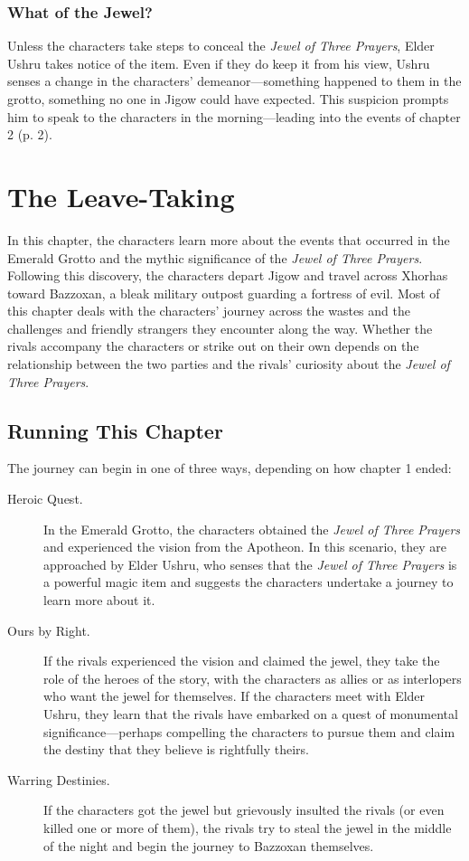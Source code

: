 \documentclass[a4paper, 11pt, bg=full, twocolumn, nooutline]{dndbook}
\begin{document}
\subsection{What of the Jewel?}

Unless the characters take steps to conceal the \textit{Jewel of Three Prayers}, Elder Ushru takes notice of the item. Even if they do keep it from his view, Ushru senses a change in the characters' demeanor---something happened to them in the grotto, something no one in Jigow could have expected. This suspicion prompts him to speak to the characters in the morning---leading into the events of chapter 2 (p. 2).

\chapter{The Leave-Taking}\label{ch:the-leave-taking-3-3}

In this chapter, the characters learn more about the events that occurred in the Emerald Grotto and the mythic significance of the \textit{Jewel of Three Prayers}. Following this discovery, the characters depart Jigow and travel across Xhorhas toward Bazzoxan, a bleak military outpost guarding a fortress of evil.
Most of this chapter deals with the characters' journey across the wastes and the challenges and friendly strangers they encounter along the way. Whether the rivals accompany the characters or strike out on their own depends on the relationship between the two parties and the rivals' curiosity about the \textit{Jewel of Three Prayers}.
\section{Running This Chapter}

The journey can begin in one of three ways, depending on how chapter 1 ended:

\begin{description}
\item[Heroic Quest.] In the Emerald Grotto, the characters obtained the \textit{Jewel of Three Prayers} and experienced the vision from the Apotheon. In this scenario, they are approached by Elder Ushru, who senses that the \textit{Jewel of Three Prayers} is a powerful magic item and suggests the characters undertake a journey to learn more about it.
\item[Ours by Right.] If the rivals experienced the vision and claimed the jewel, they take the role of the heroes of the story, with the characters as allies or as interlopers who want the jewel for themselves. If the characters meet with Elder Ushru, they learn that the rivals have embarked on a quest of monumental significance---perhaps compelling the characters to pursue them and claim the destiny that they believe is rightfully theirs.
\item[Warring Destinies.] If the characters got the jewel but grievously insulted the rivals (or even killed one or more of them), the rivals try to steal the jewel in the middle of the night and begin the journey to Bazzoxan themselves.
\end{description}
\end{document}
